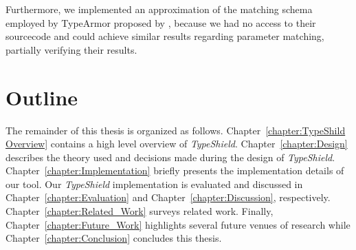 Furthermore, we implemented an approximation of the matching schema employed by TypeArmor proposed by \cite{veen:typearmor}, because we had no access to their sourcecode and could achieve similar results regarding parameter matching, partially verifying their results.

\section{Outline}
The remainder of this thesis is organized as follows.
Chapter~\ref{chapter:TypeShild Overview} contains a high level overview of \textit{TypeShield}.
Chapter~\ref{chapter:Design} describes the theory used and decisions made during the design of \textit{TypeShield}.
Chapter~\ref{chapter:Implementation} briefly presents the implementation details of our tool.
Our \textit{TypeShield} implementation is evaluated and discussed in
Chapter~\ref{chapter:Evaluation} and Chapter~\ref{chapter:Discussion}, respectively.
Chapter~\ref{chapter:Related_Work} surveys related work.
Finally, Chapter~\ref{chapter:Future_Work} highlights several future venues of research while
Chapter~\ref{chapter:Conclusion} concludes this thesis.



